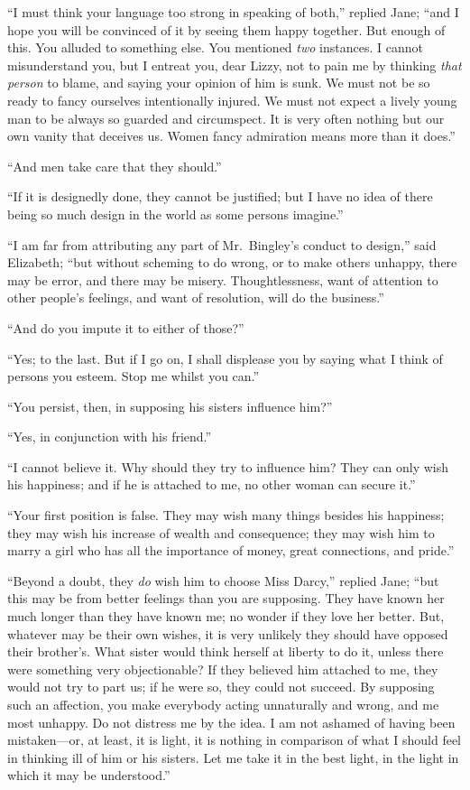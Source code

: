 ``I must think your language too strong in speaking of both,''
replied Jane; ``and I hope you will be convinced of it by seeing
them happy together.  But enough of this.  You alluded to
something else.  You mentioned \emph{two} instances.  I cannot
misunderstand you, but I entreat you, dear Lizzy, not to pain
me by thinking \emph{that person} to blame, and saying your opinion
of him is sunk.  We must not be so ready to fancy ourselves
intentionally injured.  We must not expect a lively young man to
be always so guarded and circumspect.  It is very often nothing
but our own vanity that deceives us.  Women fancy admiration
means more than it does.''

``And men take care that they should.''

``If it is designedly done, they cannot be justified; but I have no
idea of there being so much design in the world as some persons
imagine.''

``I am far from attributing any part of Mr.\ Bingley's conduct to
design,'' said Elizabeth; ``but without scheming to do wrong, or
to make others unhappy, there may be error, and there may be
misery.  Thoughtlessness, want of attention to other people's
feelings, and want of resolution, will do the business.''

``And do you impute it to either of those?''

``Yes; to the last.  But if I go on, I shall displease you by saying
what I think of persons you esteem.  Stop me whilst you can.''

``You persist, then, in supposing his sisters influence him?''

``Yes, in conjunction with his friend.''

``I cannot believe it.  Why should they try to influence him?
They can only wish his happiness; and if he is attached to me,
no other woman can secure it.''

``Your first position is false.  They may wish many things besides
his happiness; they may wish his increase of wealth and
consequence; they may wish him to marry a girl who has all the
importance of money, great connections, and pride.''

``Beyond a doubt, they \emph{do} wish him to choose Miss Darcy,''
replied Jane; ``but this may be from better feelings than you are
supposing.  They have known her much longer than they have
known me; no wonder if they love her better.  But, whatever
may be their own wishes, it is very unlikely they should have
opposed their brother's.  What sister would think herself at
liberty to do it, unless there were something very objectionable?
If they believed him attached to me, they would not try to part
us; if he were so, they could not succeed.  By supposing such
an affection, you make everybody acting unnaturally and wrong,
and me most unhappy.  Do not distress me by the idea.  I am not
ashamed of having been mistaken---or, at least, it is light, it
is nothing in comparison of what I should feel in thinking ill
of him or his sisters.  Let me take it in the best light, in
the light in which it may be understood.''


